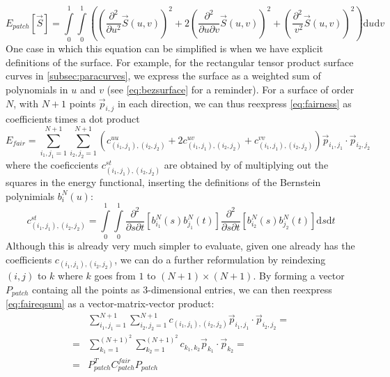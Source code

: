\begin{equation}
\label{eq:fairness}
E_{patch}\left[\vec{S}\right] = 
\int\limits_0^1 \int\limits_0^1
\left(
(\frac{\partial^2}{\partial u^2 }\vec{S}(u,v))^2
+ 2 
(\frac{\partial^2}{\partial u\partial v} \vec{S}(u,v))^2
+
(\frac{\partial^2}{\ v^2}\vec{S}(u,v))^2
\right)
\text{d}u\text{d}v
\end{equation}
One case in which this equation can be simplified is when we have explicit definitions of the surface. For example, for the rectangular \Bez tensor product surface curves in \autoref{subsec:paracurves}, we express the surface as a weighted sum of polynomials in $u$ and $v$ (see \autoref{eq:bezsurface} for a reminder). For a \Bez surface of order $N$, with $N+1$ points $\vec{p}_{i,j}$ in each direction, we can thus reexpress \autoref{eq:fairness} as coefficients times a dot product 
\begin{equation}
\label{eq:faireqsum}
E_{fair} =  \sum\limits_{i_1,j_1=1}^{N+1} \sum\limits_{i_2,j_2=1}^{N+1} \left( c_{(i_1,j_1),(i_2,j_2)}^{uu} + 2c_{(i_1,j_1),(i_2,j_2)}^{uv} + c_{(i_1,j_1),(i_2,j_2)}^{vv} \right) \vec{p}_{i_1,j_1} \cdot\vec{p}_{i_2 ,j_2} 
\end{equation} 
where the coeficcients $c_{(i_1,j_1),(i_2,j_2)}^{st}$ are obtained by of multiplying out the squares in the energy functional, inserting the definitions of the Bernstein polynimials $b_{i}^N(u)$:
\begin{equation}
c_{(i_1,j_1),(i_2,j_2)}^{st} = 
\int\limits_0^1 \int\limits_0^1 \frac{\partial^2}{\partial s \partial t} \left[b_{i_1}^N(s) b_{j_1}^N(t)\right]\frac{\partial^2}{\partial s \partial t} \left[ b_{i_2}^N(s) b_{j_2}^N(t)\right]
\text{d}s\text{d}t
\end{equation}
Although this is already very much simpler to evaluate, given one already has the coefficients $c_{(i_1,j_1),(i_2,j_2)}$, we can do a further reformulation by reindexing $(i,j)$ to $k$ where $k$ goes from $1$ to $(N+1)\times(N+1)$. By forming a vector $P_{patch}$ containg all the points as 3-dimensional entries, we can then reexpress \autoref{eq:faireqsum} as a vector-matrix-vector product:
\begin{align*}
\phantom{=}& \sum\limits_{i_1,j_1=1}^{N+1} \sum\limits_{i_2,j_2=1}^{N+1} c_{(i_1,j_1),(i_2,j_2)} \vec{p}_{i_1,j_1} \cdot\vec{p}_{i_2 ,j_2} =
\\
=& \sum\limits_{k_1=1}^{(N+1)^2} \sum\limits_{k_2=1}^{(N+1)^2} c_{k_1,k_2} \vec{p}_{k_1} \cdot\vec{p}_{k_2} =
\\
=& P_{patch}^T C_{patch}^{fair} P_{patch}
\end{align*}
